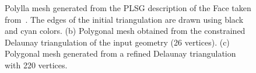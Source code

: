 \documentclass[lineno,pdflatex,sn-mathphys]{sn-jnl}%
\theoremstyle{thmstyleone}%
\theoremstyle{thmstyletwo}%
\theoremstyle{thmstylethree}%
\begin{document}
\begin{figure}[!h]
\centering     %
{} \hspace{0.1cm}
\hspace{0.1cm}
\caption{ Polylla mesh generated from the PLSG description of the Face  taken from~\cite{triangle2d}.  The edges of the initial triangulation are drawn using black and cyan colors.
(b) Polygonal  mesh  obtained from the constrained Delaunay triangulation of the input geometry (26 vertices). (c) Polygonal mesh  generated from  a  refined Delaunay triangulation with 220 vertices.}
\label{figs:facePSLG} 
\end{figure}


\end{document}
